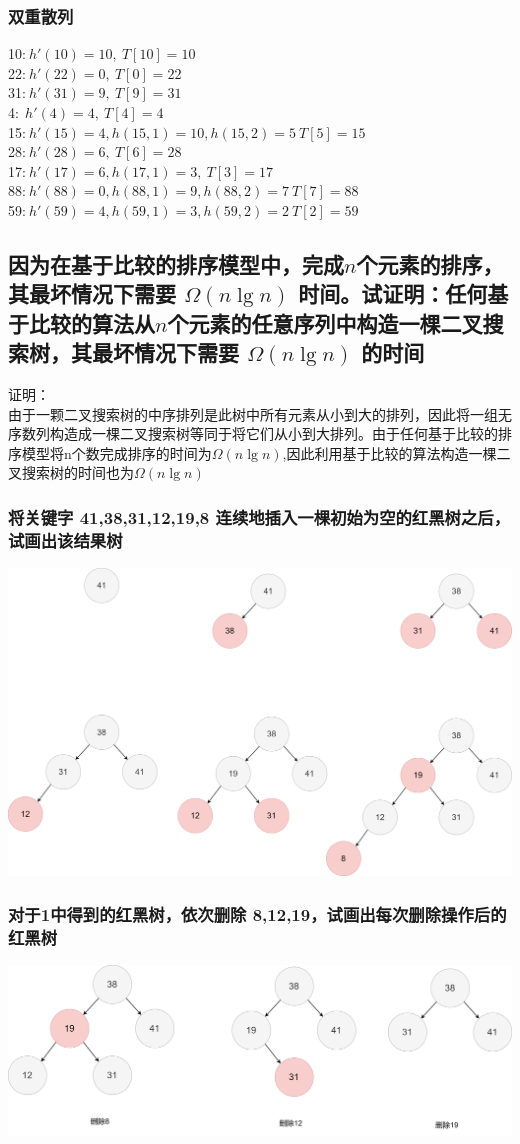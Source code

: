 \documentclass[UTF8]{ctexart}
\begin{document}
\subsubsection{双重散列}
10:$\ h'(10)=10,\ T[10]=10$\\
22:$\ h'(22)=0,\ T[0]=22$\\
31:$\ h'(31)=9,\ T[9]=31$\\
4:$\ \ h'(4)=4,\ T[4]=4$\\
15:$\ h'(15)=4,h(15,1)=10,h(15,2)=5\ T[5]=15$\\
28:$\ h'(28)=6,\ T[6]=28$\\
17:$\ h'(17)=6,h(17,1)=3,\ T[3]=17$\\
88:$\ h'(88)=0,h(88,1)=9,h(88,2)=7\ T[7]=88$\\
59:$\ h'(59)=4, h(59,1)=3,h(59,2)=2\ T[2]=59$
\subsection{因为在基于比较的排序模型中，完成$n$个元素的排序，其最坏情况下需要 $\Omega(n\lg n)$ 时间。试证明：任何基于比较的算法从$n$个元素的任意序列中构造一棵二叉搜索树，其最坏情况下需要 $\Omega(n\lg n)$ 的时间}
证明：\\
由于一颗二叉搜索树的中序排列是此树中所有元素从小到大的排列，因此将一组无序数列构造成一棵二叉搜索树等同于将它们从小到大排列。由于任何基于比较的排序模型将n个数完成排序的时间为$\Omega(n\lg n)$,因此利用基于比较的算法构造一棵二叉搜索树的时间也为$\Omega(n\lg n)$
\subsubsection{将关键字 41,38,31,12,19,8 连续地插入一棵初始为空的红黑树之后，试画出该结果树}
\includegraphics[scale=0.11]{img/4.png}
\subsubsection{对于1中得到的红黑树，依次删除 8,12,19，试画出每次删除操作后的红黑树}
\includegraphics[scale=0.13]{img/4_1.png}
\end{document}

